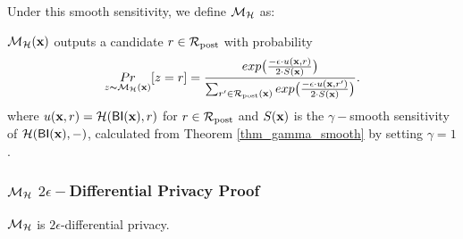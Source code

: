 \documentclass{article}
\begin{document}
Under this smooth sensitivity, we define $\mathcal{M}_{\mathcal{H}}$ as:
\begin{definition}
\label{def_smoo_2}
$\mathcal{M}_{\mathcal{H}}(\textbf{x})$ outputs a candidate $r \in \mathcal{R}_{\textup{post}}$ with probability
\begin{equation*}
  \underset{z \thicksim \mathcal{M}_{\mathcal{H}}(\textbf{x})}{Pr}[z = r] = \frac {exp\big(\frac{-\epsilon\cdot u(\textbf{x}, {r})}{2\cdot S(\textbf{x})}\big)}
{\sum_{r'\in \mathcal{R}_{\textup{post}}(\textbf{x})} exp \big(\frac{-\epsilon\cdot u(\textbf{\textbf{x}}, r')}{2 \cdot S(\textbf{x})}\big)}.
\end{equation*}
where $u(\textbf{x}, {r}) = \mathcal{H}(\mathsf{BI}(\textbf{x}),r)$ for $r \in \mathcal{R}_{\textup{post}}$ and $S(\textbf{x})$ is the $\gamma -$smooth sensitivity of $\mathcal{H}(\mathsf{BI}(\textbf{x}),-)$, calculated from Theorem \ref{thm_gamma_smooth} by setting $\gamma = 1$.
\end{definition}




\subsubsection{$\mathcal{M}_{\mathcal{H}}$ $2\epsilon-$Differential Privacy Proof}

\begin{lem}
\label{lem_hexpmech_privacy}
$\mathcal{M}_{\mathcal{H}}$ is $2\epsilon$-differential privacy.
\end{lem}
\end{document}
